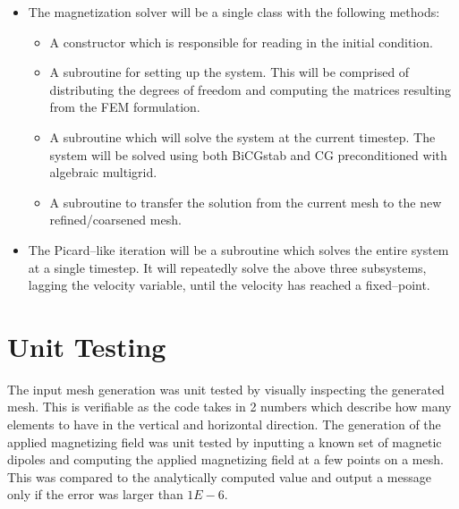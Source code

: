 \documentclass[11pt,fullpage]{article}
\theoremstyle{lemma}
\theoremstyle{definition}
\theoremstyle{lemma}
\begin{document}
\begin{itemize}
	\item The magnetization solver will be a single class with the following methods:
	\begin{itemize}
		\item A constructor which is responsible for reading in the initial condition.
		\item A subroutine for setting up the system. This will be comprised of distributing the degrees of freedom and computing the matrices resulting from the FEM formulation.
		\item A subroutine which will solve the system at the current timestep. The system will be solved using both BiCGstab and CG preconditioned with algebraic multigrid.
		\item A subroutine to transfer the solution from the current mesh to the new refined/coarsened mesh.
	\end{itemize}
	
	\item The Picard--like iteration will be a subroutine which solves the entire system at a single timestep. It will repeatedly solve the above three subsystems, lagging the velocity variable, until the velocity has reached a fixed--point. 
\end{itemize}

\section{Unit Testing}
The input mesh generation was unit tested by visually inspecting the generated mesh. This is verifiable as the code takes in 2 numbers which describe how many elements to have in the vertical and horizontal direction. The generation of the applied magnetizing field was unit tested by inputting a known set of magnetic dipoles and computing the applied magnetizing field at a few points on a mesh. This was compared to the analytically computed value and output a message only if the error was larger than $1E-6$.
\end{document}
